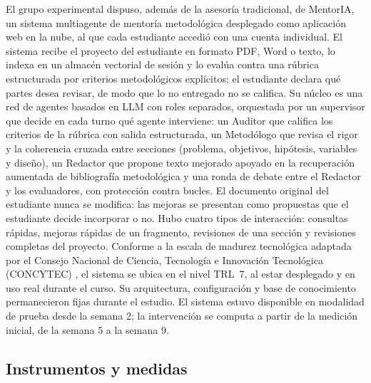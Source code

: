 \documentclass[journal]{IEEEtran}
\begin{document}
El grupo experimental dispuso, además de la asesoría tradicional, de MentorIA, un sistema multiagente de mentoría metodológica desplegado como aplicación web en la nube, al que cada estudiante accedió con una cuenta individual. El sistema recibe el proyecto del estudiante en formato PDF, Word o texto, lo indexa en un almacén vectorial de sesión y lo evalúa contra una rúbrica estructurada por criterios metodológicos explícitos; el estudiante declara qué partes desea revisar, de modo que lo no entregado no se califica. Su núcleo es una red de agentes basados en LLM con roles separados, orquestada por un supervisor que decide en cada turno qué agente interviene: un Auditor que califica los criterios de la rúbrica con salida estructurada, un Metodólogo que revisa el rigor y la coherencia cruzada entre secciones (problema, objetivos, hipótesis, variables y diseño), un Redactor que propone texto mejorado apoyado en la recuperación aumentada de bibliografía metodológica y una ronda de debate entre el Redactor y los evaluadores, con protección contra bucles. El documento original del estudiante nunca se modifica: las mejoras se presentan como propuestas que el estudiante decide incorporar o no. Hubo cuatro tipos de interacción: consultas rápidas, mejoras rápidas de un fragmento, revisiones de una sección y revisiones completas del proyecto. Conforme a la escala de madurez tecnológica adaptada por el Consejo Nacional de Ciencia, Tecnología e Innovación Tecnológica (CONCYTEC) \cite{concytec2022}, el sistema se ubica en el nivel TRL~7, al estar desplegado y en uso real durante el curso. Su arquitectura, configuración y base de conocimiento permanecieron fijas durante el estudio. El sistema estuvo disponible en modalidad de prueba desde la semana 2; la intervención se computa a partir de la medición inicial, de la semana 5 a la semana 9.

\subsection{Instrumentos y medidas}
\end{document}

